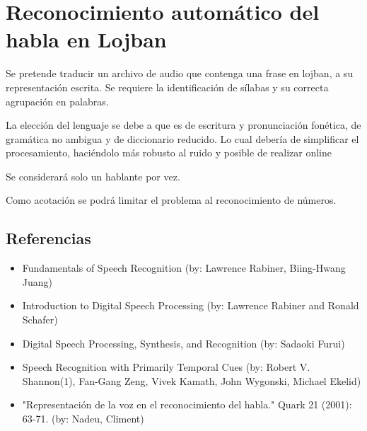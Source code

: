 \documentclass[a4paper,10pt]{article}
\begin{document}
\section*{Reconocimiento automático del habla en Lojban}
	Se pretende traducir un archivo de audio que contenga una frase en lojban, a su representación escrita.
	Se requiere la identificación de sílabas y su correcta agrupación en palabras. 

	La elección del lenguaje se debe a que es de escritura y pronunciación fonética, de gramática no ambigua y de diccionario reducido.
	Lo cual debería de simplificar el procesamiento, haciéndolo más robusto al ruido y posible de realizar online

	Se considerará solo un hablante por vez. 

	Como acotación se podrá limitar el problema al reconocimiento de números.

	\subsection*{Referencias}
		\begin{itemize}
			\item Fundamentals of Speech Recognition (by: Lawrence Rabiner, Biing-Hwang Juang)
			\item Introduction to Digital Speech Processing (by: Lawrence Rabiner and Ronald Schafer)
			\item Digital Speech Processing, Synthesis, and Recognition (by: Sadaoki Furui)
			\item Speech Recognition with Primarily Temporal Cues (by: Robert V. Shannon(1), Fan-Gang Zeng, Vivek Kamath, John Wygonski, Michael Ekelid)
			\item "Representación de la voz en el reconocimiento del habla." Quark 21 (2001): 63-71. (by: Nadeu, Climent)
		\end{itemize}
\end{document}
